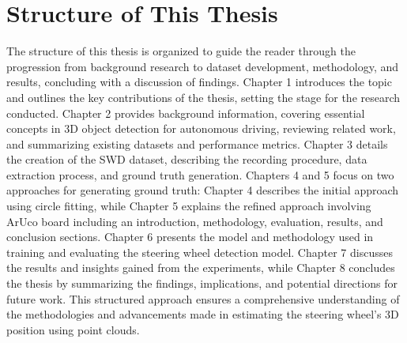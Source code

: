 \section{Structure of This Thesis}
The structure of this thesis is organized to guide the reader through the progression from background research to dataset development, methodology, and results, concluding with a discussion of findings. Chapter 1 introduces the topic and outlines the key contributions of the thesis, setting the stage for the research conducted. Chapter 2 provides background information, covering essential concepts in 3D object detection for autonomous driving, reviewing related work, and summarizing existing datasets and performance metrics. Chapter 3 details the creation of the SWD dataset, describing the recording procedure, data extraction process, and ground truth generation. Chapters 4 and 5 focus on two approaches for generating ground truth: Chapter 4 describes the initial approach using circle fitting, while Chapter 5 explains the refined approach involving ArUco board including an introduction, methodology, evaluation, results, and conclusion sections. Chapter 6 presents the model and methodology used in training and evaluating the steering wheel detection model. Chapter 7 discusses the results and insights gained from the experiments, while Chapter 8 concludes the thesis by summarizing the findings, implications, and potential directions for future work. This structured approach ensures a comprehensive understanding of the methodologies and advancements made in estimating the steering wheel’s 3D position using point clouds.




